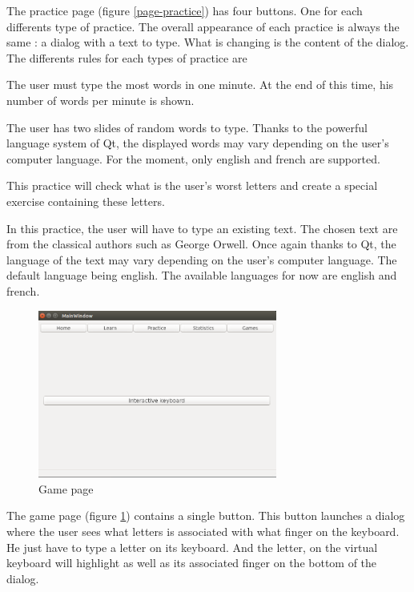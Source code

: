 The practice page  (figure \ref{page-practice}) has four buttons. One for each differents type of practice. The overall appearance of each practice is always the same : a dialog with a text to type. What is changing is the content of the dialog.\\
The differents rules for each types of practice are 
\begin{description}[align=left]
	\item[Against time/Race :] The user must type the most words in one minute. At the end of this time, his number of words per minute is shown.
	\item[Normal :] The user has two slides of random words to type. Thanks to the powerful language system of Qt, the displayed words may vary depending on the user's computer language. For the moment, only english and french are supported.
	\item[Improve :] This practice will check what is the user's worst letters and create a special exercise containing these letters.
	\item[Text :] In this practice, the user will have to type an existing text. The chosen text are from the classical authors such as George Orwell. Once again thanks to Qt, the language of the text may vary depending on the user's computer language. The default language being english. The available languages for now are english and french.
\end{description}


\begin{figure}[H]
	\centering
	\includegraphics[width=0.7\textwidth]{images/page-games.png}
	 \caption{Game page}
	 \label{page-game}
\end{figure}

The game page (figure \ref{page-game}) contains a single button. This button launches a dialog where the user sees what letters is associated with what finger on the keyboard. He just have to type a letter on its keyboard. And the letter, on the virtual keyboard will highlight as well as its associated finger on the bottom of the dialog.

